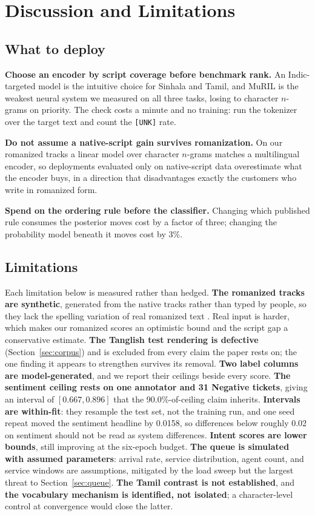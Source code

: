 \section{Discussion and Limitations}
\label{sec:discussion}

\subsection{What to deploy}

\textbf{Choose an encoder by script coverage before benchmark rank.} An
Indic-targeted model is the intuitive choice for Sinhala and Tamil, and MuRIL is
the weakest neural system we measured on all three tasks, losing to character
$n$-grams on priority. The check costs a minute and no training: run the
tokenizer over the target text and count the \texttt{[UNK]} rate.

\textbf{Do not assume a native-script gain survives romanization.} On our
romanized tracks a linear model over character $n$-grams matches a multilingual
encoder, so deployments evaluated only on native-script data overestimate what
the encoder buys, in a direction that disadvantages exactly the customers who
write in romanized form.

\textbf{Spend on the ordering rule before the classifier.} Changing which
published rule consumes the posterior moves cost by a factor of three; changing
the probability model beneath it moves cost by 3\%.

\subsection{Limitations}

Each limitation below is measured rather than hedged. \textbf{The romanized
tracks are synthetic}, generated from the native tracks rather than typed by
people, so they lack the spelling variation of real romanized text
\cite{chakravarthi2020tamilmix}. Real input is harder, which makes our romanized
scores an optimistic bound and the script gap a conservative estimate.
\textbf{The Tanglish test rendering is defective} (Section~\ref{sec:corpus}) and
is excluded from every claim the paper rests on; the one finding it appears to
strengthen survives its removal. \textbf{Two label columns are model-generated},
and we report their ceilings beside every score. \textbf{The sentiment ceiling
rests on one annotator and 31 Negative tickets}, giving an interval of
$[0.667, 0.896]$ that the 90.0\%-of-ceiling claim inherits. \textbf{Intervals
are within-fit}: they resample the test set, not the training run, and one seed
repeat moved the sentiment headline by 0.0158, so differences below roughly 0.02
on sentiment should not be read as system differences. \textbf{Intent scores are
lower bounds}, still improving at the six-epoch budget. \textbf{The queue is
simulated with assumed parameters}: arrival rate, service distribution, agent
count, and service windows are assumptions, mitigated by the load sweep but the
largest threat to Section~\ref{sec:queue}. \textbf{The Tamil contrast is not
established}, and \textbf{the vocabulary mechanism is identified, not
isolated}; a character-level control at convergence \cite{clark2022canine} would
close the latter.
